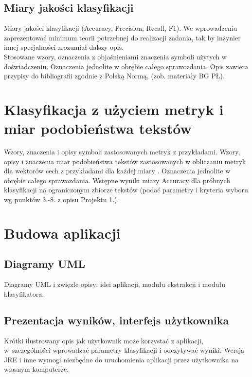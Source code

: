 \documentclass{classrep}
\begin{document}
\subsection{Miary jakości klasyfikacji} 
Miary jakości klasyfikacji (Accuracy, Precision,
Recall, F1). We wprowadzeniu zaprezentować minimum teorii potrzebnej do realizacji
zadania, tak by inżynier innej specjalności zrozumiał dalszy opis.\\
\indent Stosowane wzory, oznaczenia z objaśnieniami znaczenia symboli użytych w
doświadczeniu. Oznaczenia jednolite w obrębie całego sprawozdania.  Opis zawiera przypisy do bibliografii zgodnie z
Polską Normą, (zob. materiały BG PŁ).\\


\section{Klasyfikacja z użyciem metryk i miar podobieństwa tekstów}
Wzory, znaczenia i opisy symboli zastosowanych metryk z
przykładami. Wzory, opisy i znaczenia miar
podobieństwa tekstów zastosowanych w obliczaniu metryk dla wektorów cech z
przykładami dla każdej miary \cite{niewiadomski08}.  Oznaczenia jednolite w obrębie całego sprawozdania.  Wstępne wyniki miary Accuracy dla próbnych klasyfikacji na ograniczonym zbiorze tekstów (podać parametry i kryteria
wyboru wg punktów 3.-8. z opisu Projektu 1.). \\ 

\section{Budowa aplikacji}
\subsection{Diagramy UML}
Diagramy UML i zwięzłe opisy: idei aplikacji, modułu ekstrakcji i modułu
klasyfikatora.\\

\subsection{Prezentacja wyników, interfejs użytkownika} 
Krótki ilustrowany opis jak użytkownik może korzystać z aplikacji, w~szczególności wprowadzać parametry klasyfikacji i odczytywać wyniki. Wersja JRE i inne wymogi
niezbędne do uruchomienia aplikacji przez użytkownika na własnym komputerze. \\
\end{document}
